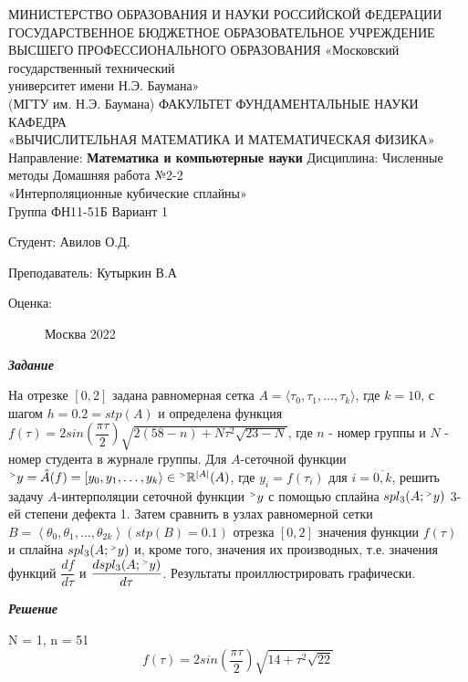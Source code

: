 \documentclass[12pt]{article}
\begin{document}
	
	\begin{center}
		МИНИСТЕРСТВО ОБРАЗОВАНИЯ И НАУКИ РОССИЙСКОЙ ФЕДЕРАЦИИ \\ ГОСУДАРСТВЕННОЕ БЮДЖЕТНОЕ ОБРАЗОВАТЕЛЬНОЕ УЧРЕЖДЕНИЕ \\ 
		ВЫСШЕГО ПРОФЕССИОНАЛЬНОГО ОБРАЗОВАНИЯ
		\vskip 1.5cm
		«Московский государственный технический \\
		университет имени Н.Э. Баумана» \\
		(МГТУ им. Н.Э. Баумана)
		\vskip 1.5cm
		ФАКУЛЬТЕТ ФУНДАМЕНТАЛЬНЫЕ НАУКИ \\
		КАФЕДРА \\
		«ВЫЧИСЛИТЕЛЬНАЯ МАТЕМАТИКА И МАТЕМАТИЧЕСКАЯ ФИЗИКА»
		\vskip 0.4cm
		Направление: \textbf{Математика и компьютерные науки}
		\vskip 0.4cm
		Дисциплина: Численные методы
		\vskip 0.4cm
		Домашняя работа №2-2 \\
		«Интерполяционные кубические сплайны» \\
		Группа ФН11-51Б
		\vskip 0.2cm
		Вариант 1
		
		
		\vskip 1.5cm
		\begin{flushright}
			Студент: Авилов О.Д.
			
			\vskip 1.5cm
			
			Преподаватель: Кутыркин В.А
		\end{flushright}
		Оценка:
		
		\begin{figure}[b]
			\begin{center}
				Москва 2022
			\end{center}
		\end{figure}
		
	\end{center}
	
	\newpage
	\begin{center}
		\textbf{\textit{Задание}}
	\end{center}
На отрезке $[0,2]$ задана равномерная сетка $A = \langle \tau_0, \tau_1, \dots, \tau_{k} \rangle $, где $k = 10$, с шагом $h = 0.2 = stp(A)$ и определена функция
$f(\tau) = 2sin \left(\dfrac{ \pi \tau} 2 \right) \sqrt{2(58-n) + N \tau^2 \sqrt{23-N}}$, где $n$ - номер группы и $N$ - номер студента в журнале группы. Для $A$-сеточной функции ${}^{\mathsmaller{>}} y = \hat A(f) =  [y_0, y_1, \dots, y_{k} \rangle \in {}^{\mathsmaller{>}}{\mathbb R}^{|A|}(A)$, где $y_i = f(\tau_i)$ для $i = \overline{0,k}$, решить задачу $A$-интерполяции сеточной функции ${}^{\mathsmaller{>}} y$ с помощью сплайна $spl_3(A; {}^{\mathsmaller{>}} y)$ 3-ей степени дефекта 1. Затем сравнить в узлах равномерной сетки
$B = \left\langle \theta_0, \theta_1, \ldots, \theta_{2k} \right\rangle (stp(B) = 0.1)$ отрезка $[0,2]$ значения функции $f(\tau)$ и сплайна $spl_3(A; {}^{\mathsmaller{>}} y)$ и, кроме того, значения их
производных, т.е. значения функций $\dfrac{df}{d \tau}$ и $\dfrac{d spl_3(A; {}^{\mathsmaller{>}} y)}{d \tau}$. Результаты проиллюстрировать
графически.
 	\begin{center}
	\textbf{\textit{Решение}}
\end{center}
N = 1, n = 51
$$ f(\tau) = 2sin \left(\dfrac{ \pi \tau} 2 \right) \sqrt{14 + \tau^2 \sqrt{22}}
$$
\end{document}
